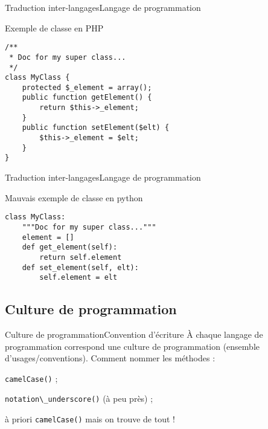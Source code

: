 \documentclass[notes]{beamer}
\begin{document}
\begin{frame}[fragile]{Traduction inter-langages}{Langage de programmation}
\begin{exampleblock}{Exemple de classe en PHP}
\lstset{ %
language=PHP,                %
basicstyle=\scriptsize,       %
}
\begin{lstlisting}
/**
 * Doc for my super class...
 */
class MyClass {
    protected $_element = array();
    public function getElement() {
        return $this->_element;
    }
    public function setElement($elt) {
        $this->_element = $elt;
    }
}
\end{lstlisting}
\end{exampleblock}
\end{frame}

\begin{frame}[fragile]{Traduction inter-langages}{Langage de programmation}
\pause
\begin{alertblock}{Mauvais exemple de classe en python}
\pause
\lstset{ %
language=python,
basicstyle=\scriptsize,
}
\begin{lstlisting}
class MyClass:
    """Doc for my super class..."""
    element = []
    def get_element(self):
        return self.element
    def set_element(self, elt):
        self.element = elt
\end{lstlisting}
\end{alertblock}
\end{frame}

\subsection{Culture de programmation}

\begin{frame}{Culture de programmation}{Convention d'écriture}
\pause
À chaque langage de programmation correspond une culture de programmation (ensemble d'usages/conventions).
\vspace*{1mm}
\pause
Comment nommer les méthodes : \pause
\begin{description}[<+->]
\item[Java] \verb!camelCase()! ;
\item[Python] \verb!notation\_underscore()! (à peu près) ;
\item[PHP] à priori \verb!camelCase()! mais on trouve de tout !
\end{description}
\end{frame}
\end{document}

